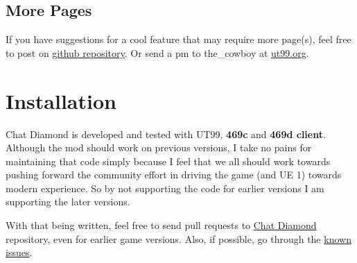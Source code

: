 \documentclass{article}
\theoremstyle{definition}
\begin{document}
\subsection{More Pages}
If you have suggestions for a cool feature that may require more page(s), feel free to post on \href{https://github.com/ravimohan1991/ChatDiamond/issues}{github repository}. Or send a pm to the\_cowboy at \href{https://ut99.org}{ut99.org}.


\section{Installation}
Chat Diamond is developed and tested with UT99, \textbf{469c} and \textbf{469d client}.  Although the mod should work on previous versions, I take no pains for maintaining that code simply because I feel that we all should work towards pushing forward the community effort in driving the game (and UE 1) towards modern experience.  So by not supporting the code for earlier versions I am supporting the later versions.

With that being written, feel free to send pull requests to \href{https://github.com/ravimohan1991/ChatDiamond/}{Chat Diamond} repository, even for earlier game versions.  Also, if possible, go through the \href{https://github.com/ravimohan1991/ChatDiamond/issues}{known issues}.
\end{document}
